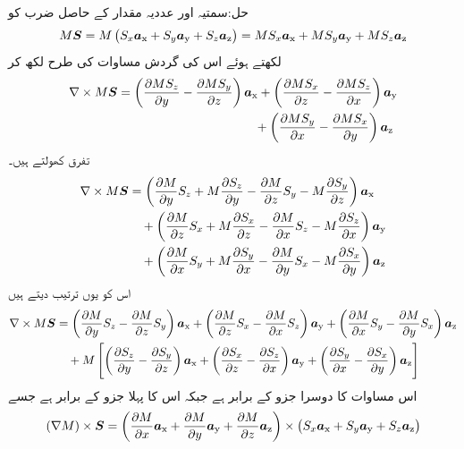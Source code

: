 حل:سمتیہ اور عددیہ مقدار کے حاصل ضرب کو
\begin{align*}
M {{\boldsymbol{S}}}=M\left(S_x{\boldsymbol{a}}_{\textup{x}}+S_y{\boldsymbol{a}}_{\textup{y}}+S_z{\boldsymbol{a}}_{\textup{z}} \right)=M S_x{\boldsymbol{a}}_{\textup{x}}+M S_y{\boldsymbol{a}}_{\textup{y}}+M S_z{\boldsymbol{a}}_{\textup{z}}
\end{align*}
لکھتے ہوئے اس کی گردش مساوات  کی طرح لکھ کر
\begin{equation*}
\begin{split}
\nabla \times M{{\boldsymbol{S}}}&=\left(\frac{\partial MS_z}{\partial y}-\frac{\partial MS_y}{\partial z} \right){\boldsymbol{a}}_{\textup{x}}+\left( \frac{\partial MS_x}{\partial z}-\frac{\partial MS_z}{\partial x}\right){\boldsymbol{a}}_{\textup{y}} \\
& \quad \quad \quad\quad \quad \quad\quad \quad \quad\quad \quad +\left(\frac{\partial MS_y}{\partial x}-\frac{\partial MS_x}{\partial y} \right){\boldsymbol{a}}_{\textup{z}}
\end{split}
\end{equation*}
تفرق کھولتے ہیں۔
\begin{align*}
\nabla \times M{{\boldsymbol{S}}}&=\left(\frac{\partial M}{\partial y}S_z+M\frac{\partial S_z}{\partial y}-\frac{\partial M}{\partial z}S_y-M\frac{\partial S_y}{\partial z} \right){\boldsymbol{a}}_{\textup{x}}\\
&\quad +\left( \frac{\partial M}{\partial z}S_x+M\frac{\partial S_x}{\partial z}-\frac{\partial M}{\partial x}S_z-M\frac{\partial S_z}{\partial x}\right){\boldsymbol{a}}_{\textup{y}} \\
&\quad +\left(\frac{\partial M}{\partial x}S_y+M\frac{\partial S_y}{\partial x}-\frac{\partial M}{\partial y}S_x-M\frac{\partial S_x}{\partial y} \right){\boldsymbol{a}}_{\textup{z}}
\end{align*}
اس کو یوں ترتیب دیتے ہیں
\begin{align*}
\nabla \times M{{\boldsymbol{S}}}&=\left(\frac{\partial M}{\partial y}S_z-\frac{\partial M}{\partial z}S_y\right){\boldsymbol{a}}_{\textup{x}}+\left( \frac{\partial M}{\partial z}S_x-\frac{\partial M}{\partial x}S_z\right){\boldsymbol{a}}_{\textup{y}}+\left(\frac{\partial M}{\partial x}S_y-\frac{\partial M}{\partial y}S_x\right){\boldsymbol{a}}_{\textup{z}}\\
&\quad +M\left[\left(\frac{\partial S_z}{\partial y}-\frac{\partial S_y}{\partial z} \right){\boldsymbol{a}}_{\textup{x}}+\left(\frac{\partial S_x}{\partial z}-\frac{\partial S_z}{\partial x}\right){\boldsymbol{a}}_{\textup{y}} +\left(\frac{\partial S_y}{\partial x}-\frac{\partial S_x}{\partial y} \right){\boldsymbol{a}}_{\textup{z}}\right]
\end{align*}
اس مساوات کا دوسرا جزو  کے برابر ہے جبکہ اس کا پہلا جزو  کے برابر ہے جسے 
\begin{align*}
\left(\nabla M\right) \times {\ensuremath{{\boldsymbol{S}}}}=\left(\frac{\partial M}{\partial x}{\boldsymbol{a}}_{\textup{x}}+\frac{\partial M}{\partial y}{\boldsymbol{a}}_{\textup{y}}+\frac{\partial M}{\partial z}{\boldsymbol{a}}_{\textup{z}} \right) \times \left(S_x {\boldsymbol{a}}_{\textup{x}}+S_y {\boldsymbol{a}}_{\textup{y}} +S_z {\boldsymbol{a}}_{\textup{z}} \right)
\end{align*}

